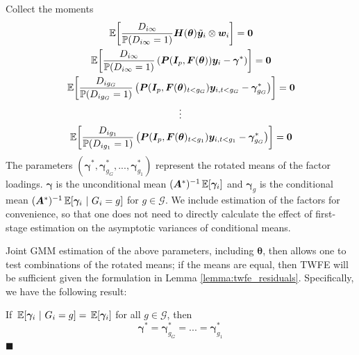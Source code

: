 \documentclass[12pt]{article}
\begin{document}
Collect the moments 
\begin{gather*}
    \expec{\frac{D_{i \infty}}{\mathbb{P}(D_{i \infty} = 1)}\bm H(\bm{\theta}) \tilde{\bm y}_i \otimes \bm w_i} = \bm 0\\
    \expec{\frac{D_{i \infty}}{\mathbb{P}(D_{i \infty} = 1)} \left( \bm P(\bm I_p, \bm{F}(\bm{\theta})) \bm y_i - \bm \gamma^* \right)} = \bm 0\\
    \expec{\frac{D_{i g_G}}{\mathbb{P}(D_{ig_G} = 1)} \left( \bm P(\bm I_p, \bm{F}(\bm{\theta})_{t < g_G}) \bm y_{i,t < g_G} - \bm \gamma_{g_G}^* \right) } = \bm 0\\
    \vdots\\
    \expec{\frac{D_{i g_1}}{\mathbb{P}(D_{ig_1} = 1)} \left( \bm P(\bm I_p, \bm{F}(\bm{\theta})_{t < g_1}) \bm y_{i,t < g_1} - \bm \gamma_{g_G}^* \right) } = \bm 0
\end{gather*}
The parameters $(\bm \gamma^*, \bm \gamma_{g_G}^*,...,\bm \gamma_{g_1}^*)$ represent the rotated means of the factor loadings. $\bm \gamma$ is the unconditional mean $(\bm A^*)^{-1}\expec{\bm \gamma_i}$ and $\bm \gamma_g$ is the conditional mean $(\bm A^*)^{-1}\expec{\bm \gamma_i}{G_i = g}$ for $g \in \mathcal{G}$. We include estimation of the factors for convenience, so that one does not need to directly calculate the effect of first-stage estimation on the asymptotic variances of conditional means. 

Joint GMM estimation of the above parameters, including $\bm{\theta}$, then allows one to test combinations of the rotated means; if the means are equal, then TWFE will be sufficient given the formulation in Lemma \ref{lemma:twfe_residuals}. Specifically, we have the following result: 
\begin{theorem}
    If $\expec{\bm \gamma_i}{G_i = g} = \expec{\bm \gamma_i}$ for all $g \in \mathcal{G}$, then
    \begin{equation}
        \bm \gamma^* = \bm \gamma_{g_G}^* = ... = \bm \gamma_{g_1}^*
    \end{equation}
    $\blacksquare$
\end{theorem}
\end{document}
